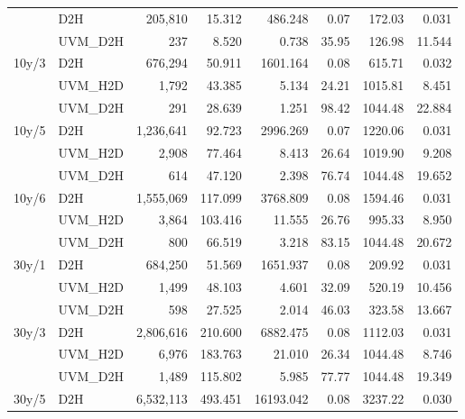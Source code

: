 \begin{table}[t]
{\begin{tabular}{llrrrrrr}
   & D2H & 205,810 & 15.312 & 486.248 & 0.07 & 172.03 & 0.031 \\
   & UVM_D2H & 237 & 8.520 & 0.738 & 35.95 & 126.98 & 11.544 \\
  \midrule
  10y/3%
   & D2H & 676,294 & 50.911 & 1601.164 & 0.08 & 615.71 & 0.032 \\
   & UVM_H2D & 1,792 & 43.385 & 5.134 & 24.21 & 1015.81 & 8.451 \\
   & UVM_D2H & 291 & 28.639 & 1.251 & 98.42 & 1044.48 & 22.884 \\
  \midrule
  10y/5%
   & D2H & 1,236,641 & 92.723 & 2996.269 & 0.07 & 1220.06 & 0.031 \\
   & UVM_H2D & 2,908 & 77.464 & 8.413 & 26.64 & 1019.90 & 9.208 \\
   & UVM_D2H & 614 & 47.120 & 2.398 & 76.74 & 1044.48 & 19.652 \\
  \midrule
  10y/6%
   & D2H & 1,555,069 & 117.099 & 3768.809 & 0.08 & 1594.46 & 0.031 \\
   & UVM_H2D & 3,864 & 103.416 & 11.555 & 26.76 & 995.33 & 8.950 \\
   & UVM_D2H & 800 & 66.519 & 3.218 & 83.15 & 1044.48 & 20.672 \\
  \midrule
  30y/1%
   & D2H & 684,250 & 51.569 & 1651.937 & 0.08 & 209.92 & 0.031 \\
   & UVM_H2D & 1,499 & 48.103 & 4.601 & 32.09 & 520.19 & 10.456 \\
   & UVM_D2H & 598 & 27.525 & 2.014 & 46.03 & 323.58 & 13.667 \\
  \midrule
  30y/3%
   & D2H & 2,806,616 & 210.600 & 6882.475 & 0.08 & 1112.03 & 0.031 \\
   & UVM_H2D & 6,976 & 183.763 & 21.010 & 26.34 & 1044.48 & 8.746 \\
   & UVM_D2H & 1,489 & 115.802 & 5.985 & 77.77 & 1044.48 & 19.349 \\
  \midrule
  30y/5%
   & D2H & 6,532,113 & 493.451 & 16193.042 & 0.08 & 3237.22 & 0.030 \\

\end{tabular}}
\end{table}
